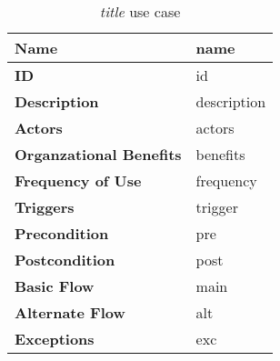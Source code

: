 \begin{table}
\begin{tabular}{|>{\raggedright\arraybackslash}p{3.2cm}|>{\raggedright\arraybackslash}p{10cm}|}
\hline
\textbf{Name}                   & name \\
\hline
\textbf{ID}                     & id \\
\hline
\textbf{Description}            & description \\
\hline
\textbf{Actors}                 & actors \\
\hline
\textbf{Organzational Benefits} & benefits \\
\hline
\textbf{Frequency of Use}       & frequency \\
\hline
\textbf{Triggers}               & trigger \\
\hline
\textbf{Precondition}           & pre \\
\hline
\textbf{Postcondition}          & post \\
\hline
\textbf{Basic Flow}             & main \\
\hline
\textbf{Alternate Flow}         & alt \\
\hline
\textbf{Exceptions}             & exc \\
\hline
\end{tabular}
\caption{\textit{title} use case}
\label{id}
\end{table}

